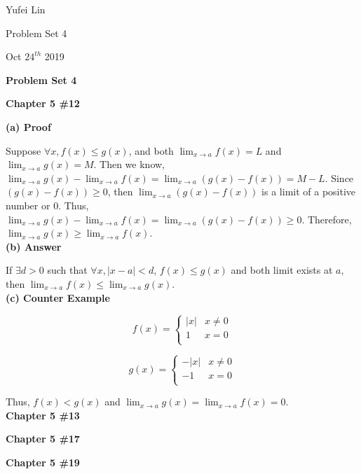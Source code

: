 \documentclass[a4paper,12pt]{report}
\begin{document}
\noindent
Yufei Lin

\noindent
Problem Set 4

\noindent
Oct \(24^{th}\) 2019

\begin{center}
\textbf{Problem Set 4}
\end{center}

\noindent
\textbf{Chapter 5 \#12}

\noindent
\textbf{(a) Proof }

\noindent
Suppose $\forall x, f(x)\leq g(x)$, and both $\displaystyle{\lim_{x\to a}}f(x) = L$ and $\displaystyle{\lim_{x\to a}}g(x) = M$. Then we know, $\displaystyle{\lim_{x\to a}}g(x)-\displaystyle{\lim_{x\to a}}f(x)=\displaystyle{\lim_{x\to a}}(g(x)-f(x)) = M-L$. Since $(g(x)-f(x))\geq 0$, then $\displaystyle{\lim_{x\to a}}(g(x)-f(x))$ is a limit of a positive number or 0. Thus,  $\displaystyle{\lim_{x\to a}}g(x)-\displaystyle{\lim_{x\to a}}f(x)=\displaystyle{\lim_{x\to a}}(g(x)-f(x))\geq 0$. Therefore, $\displaystyle{\lim_{x\to a}}g(x)\geq \displaystyle{\lim_{x\to a}}f(x)$.\\

\noindent
\textbf{(b) Answer }

\noindent
If $\exists d >0$ such that $\forall x, |x-a|<d$, $f(x)\leq g(x)$ and both limit exists at $a$, then $\displaystyle{\lim_{x\to a}}f(x)\leq \displaystyle{\lim_{x\to a}}g(x)$.\\

\noindent
\textbf{(c) Counter Example}

\[  f(x)= \left\{
\begin{array}{ll}
      |x| & x\neq 0 \\
      1 & x = 0 \\
\end{array} 
\right. \]

\[  g(x)= \left\{
\begin{array}{ll}
      -|x| & x\neq 0 \\
      -1 & x = 0 \\
\end{array} 
\right. \]

\noindent
Thus, $f(x)<g(x)$ and $\displaystyle{\lim_{x\to a}}g(x) = \displaystyle{\lim_{x\to a}}f(x) = 0$.\\

\noindent
\textbf{Chapter 5 \#13}

\noindent
\textbf{Chapter 5 \#17}

\noindent
\textbf{Chapter 5 \#19}
\end{document}
